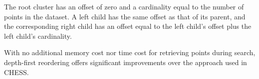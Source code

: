 The root cluster has an offset of zero and a cardinality equal to the number of points in the dataset.
A left child has the same offset as that of its parent, and the corresponding right child has an offset equal to the left child's offset plus the left child's cardinality.

With no additional memory cost nor time cost for retrieving points during search, depth-first reordering offers significant improvements over the approach used in CHESS.







